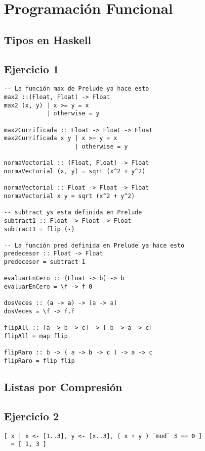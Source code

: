\section{Programación Funcional}
\subsection*{Tipos en Haskell}
\subsection{Ejercicio 1}
\begin{centrado}
\begin{verbatim}
-- La función max de Prelude ya hace esto
max2 ::(Float, Float) -> Float
max2 (x, y) | x >= y = x        
            | otherwise = y

max2Currificada :: Float -> Float -> Float
max2Currificada x y | x >= y = x
                    | otherwise = y

normaVectorial :: (Float, Float) -> Float
normaVectorial (x, y) = sqrt (x^2 + y^2)

normaVectorial :: Float -> Float -> Float
normaVectorial x y = sqrt (x^2 + y^2)

-- subtract ys esta definida en Prelude
subtract1 :: Float -> Float -> Float  
subtract1 = flip (-)

-- La función pred definida en Prelude ya hace esto
predecesor :: Float -> Float  
predecesor = subtract 1

evaluarEnCero :: (Float -> b) -> b
evaluarEnCero = \f -> f 0

dosVeces :: (a -> a) -> (a -> a)
dosVeces = \f -> f.f

flipAll :: [a -> b -> c] -> [ b -> a -> c]
flipAll = map flip

flipRaro :: b -> ( a -> b -> c ) -> a -> c
flipRaro = flip flip
\end{verbatim}
\end{centrado}

\subsection*{Listas por Compresión}
\subsection{Ejercicio 2}
\begin{centrado}
\begin{verbatim}
[ x | x <- [1..3], y <- [x..3], ( x + y ) `mod` 3 == 0 ] 
  = [ 1, 3 ]
\end{verbatim}
\end{centrado}

